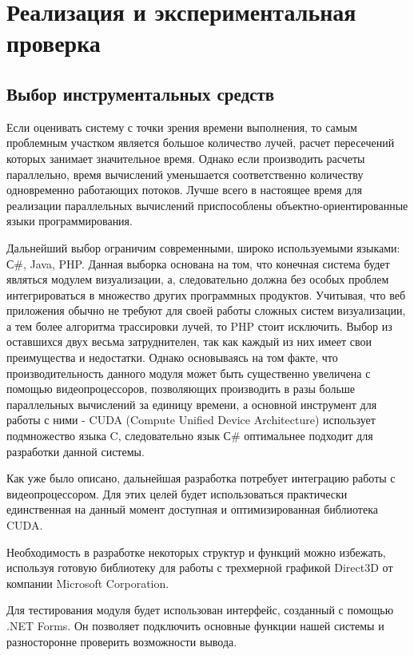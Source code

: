 \chapter{Реализация и экспериментальная проверка}


\section{Выбор инструментальных средств}

Если оценивать систему с точки зрения времени выполнения, то самым проблемным участком является большое количество лучей, расчет пересечений которых занимает значительное время. Однако если производить расчеты параллельно, время вычислений уменьшается соответственно количеству одновременно работающих потоков. Лучше всего в настоящее время для реализации параллельных вычислений приспособлены объектно-ориентированные языки программирования.

Дальнейший выбор ограничим современными, широко используемыми языками: С\#, Java, PHP. Данная выборка основана на том, что конечная система будет являться модулем визуализации, а, следовательно должна без особых проблем интегрироваться в множество других программных продуктов. Учитывая, что веб приложения обычно не требуют для своей работы сложных систем визуализации, а тем более алгоритма трассировки лучей, то PHP стоит исключить. Выбор из оставшихся двух весьма затруднителен, так как каждый из них имеет свои преимущества и недостатки. Однако основываясь на том факте, что производительность данного модуля может быть существенно увеличена с помощью видеопроцессоров, позволяющих производить в разы больше параллельных вычислений за единицу времени, а основной инструмент для работы с ними - CUDA (Compute Unified Device Architecture) \cite{Cuda2} использует подмножество языка C, следовательно язык С\# \cite{Troel,Riht} оптимальнее подходит для разработки данной системы.

Как уже было описано, дальнейшая разработка потребует интеграцию работы с видеопроцессором. Для этих целей будет использоваться практически единственная на данный момент доступная и оптимизированная библиотека CUDA.

Необходимость в разработке некоторых структур и функций можно избежать, используя готовую библиотеку для работы с трехмерной графикой Direct3D от компании Microsoft Corporation.

Для тестирования модуля будет использован интерфейс, созданный с помощью .NET Forms. Он позволяет подключить основные функции нашей системы и разносторонне проверить возможности вывода.


